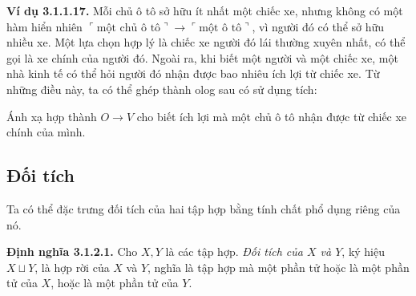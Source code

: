 \noindent\textbf{Ví dụ 3.1.1.17.} Mỗi chủ ô tô sở hữu ít nhất một chiếc xe, nhưng không có một hàm hiển nhiên $\ulcorner\text{một chủ ô tô}\urcorner\to\ulcorner\text{một ô tô}\urcorner$, vì người đó có thể sở hữu nhiều xe. Một lựa chọn hợp lý là chiếc xe người đó lái thường xuyên nhất, có thể gọi là xe chính của người đó. Ngoài ra, khi biết một người và một chiếc xe, một nhà kinh tế có thể hỏi người đó nhận được bao nhiêu ích lợi từ chiếc xe. Từ những điều này, ta có thể ghép thành olog sau có sử dụng tích:
\begin{center}\end{center}
Ánh xạ hợp thành $O\to V$ cho biết ích lợi mà một chủ ô tô nhận được từ chiếc xe chính của mình.

\subsection{Đối tích}
Ta có thể đặc trưng đối tích của hai tập hợp bằng tính chất phổ dụng riêng của nó.

\noindent\textbf{Định nghĩa 3.1.2.1.} Cho $X,Y$ là các tập hợp. \emph{Đối tích của $X$ và $Y$}, ký hiệu $X\sqcup Y$, là hợp rời của $X$ và $Y$, nghĩa là tập hợp mà một phần tử hoặc là một phần tử của $X$, hoặc là một phần tử của $Y$.
